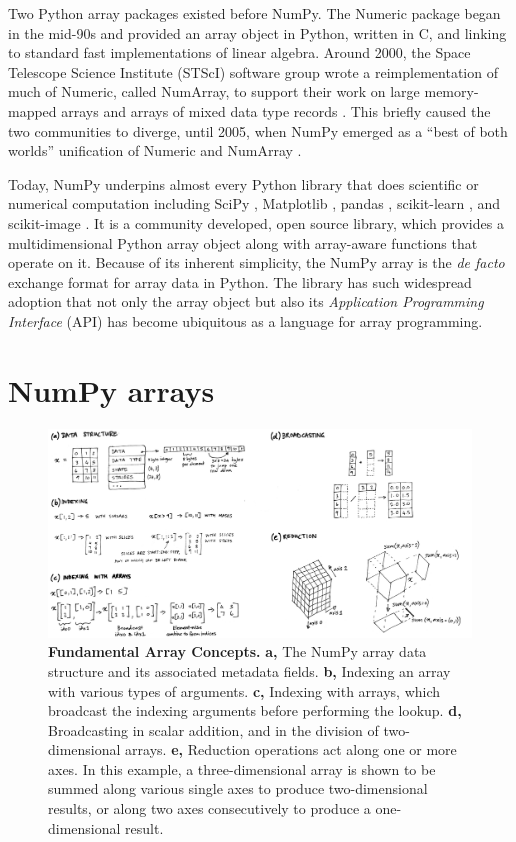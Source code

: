 Two Python array packages existed before NumPy.
The Numeric package began in the mid-90s and provided an array object in
Python, written in C, and linking to standard fast implementations of linear
algebra.
Around 2000, the Space Telescope Science Institute (STScI) software group wrote
a reimplementation of much of Numeric, called NumArray, to support their work
on large memory-mapped arrays and arrays of mixed data type
records \cite{STScI-slither}.
This briefly caused the two communities to diverge, until
2005, when NumPy emerged as a ``best of both worlds'' unification of Numeric
and NumArray \cite{oliphant2006guide}.

Today, NumPy underpins almost every Python library that does scientific or
numerical computation including SciPy \cite{virtanen2019scipy},
Matplotlib \cite{hunter2007matplotlib}, pandas \cite{mckinney-proc-scipy-2010},
scikit-learn \cite{pedregosa2011scikit}, and
scikit-image \cite{vanderwalt2014scikit}.
It is a community developed, open source library, which provides a
multidimensional Python array object along with array-aware functions
that operate on it.
Because of its inherent simplicity, the NumPy array is
the {\it de facto} exchange format for array data in Python.
The library has such widespread adoption that not only the array object but also its
{\it Application Programming Interface} (API) has become ubiquitous as
a language for array programming.

\section*{NumPy arrays}

\begin{figure}
  \centering
  \includegraphics[width=\textwidth]{static/sketches/array-concepts}   
  \caption{\textbf{Fundamental Array Concepts.}
    \textbf{a,} The NumPy array data structure and its associated metadata fields.
    \textbf{b,} Indexing an array with various types of arguments.
    \textbf{c,} Indexing with arrays, which broadcast the indexing arguments before performing the lookup.
    \textbf{d,} Broadcasting in scalar addition, and in the division of two-dimensional arrays.
    \textbf{e,} Reduction operations act along one or more axes. In this
    example, a three-dimensional array is shown to be summed along various single
    axes to produce two-dimensional results, or along two axes consecutively to
    produce a one-dimensional result.
   }
  \label{fig:array-concepts}
\end{figure}

